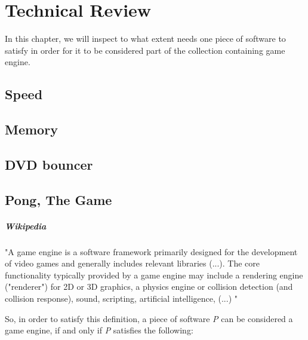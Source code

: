 


\chapter*{Technical Review}


    In this chapter, we will inspect to what extent needs one piece of software to satisfy in order for it to be considered part of the collection containing game engine.
    
    \section*{Speed}
    \section*{Memory}

    \section*{DVD bouncer}
    \section*{Pong, The Game}

    \paragraph*{Wikipedia} "A game engine is a software framework primarily designed for the development of video games and generally includes relevant libraries
    (...).
    The core functionality typically provided by a game engine may include a rendering engine ("renderer") for 2D or 3D graphics, a physics engine or collision detection (and collision response), sound, scripting, artificial intelligence, 
    (...)
    "

    So, in order to satisfy this definition, a piece of software \emph{P} can be considered a game engine, if and only if \emph{P} satisfies the following:

